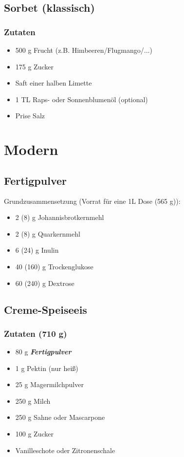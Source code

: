 \documentclass[12pt]{article}
\begin{document}
\subsection {Sorbet (klassisch)}
\subsubsection {Zutaten}
\begin{itemize}
  	\item 500 g Frucht (z.B. Himbeeren/Flugmango/...)
  	\item 175 g Zucker
  	\item Saft einer halben Limette %
  	\item 1 TL Raps- oder Sonnenblumenöl (optional)
	\item Prise Salz
\end{itemize}

\pagebreak
\section {Modern}

\subsection{Fertigpulver}

Grundzusammensetzung (Vorrat für eine 1L Dose (565 g)):

\begin{itemize}
  \item 2 (8) g Johannisbrotkernmehl
  \item 2 (8) g Quarkernmehl
  \item 6 (24) g Inulin 
  \item 40 (160) g Trockenglukose
  \item 60 (240) g Dextrose
\end{itemize}


\pagebreak
\subsection {Creme-Speiseeis}

\subsubsection {Zutaten (710 g)}
\begin{itemize}
	\item 80 g \textbf{\textit{Fertigpulver}}
  	\item 1 g Pektin (nur heiß)
  	\item 25 g Magermilchpulver
\end{itemize}
\begin{itemize}
  	\item 250 g Milch 
  	\item 250 g Sahne oder Mascarpone
  	\item 100 g Zucker
  	\item Vanilleschote oder Zitronenschale
\end{itemize}
\end{document}
